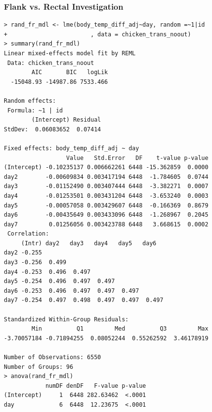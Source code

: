 \documentclass[a4paper, 10pt, titlepage]{article}
\begin{document}
\subsubsection{Flank vs. Rectal Investigation}
\begin{lstlisting}[basicstyle = \footnotesize \ttfamily]
> rand_fr_mdl <- lme(body_temp_diff_adj~day, random =~1|id
+                        , data = chicken_trans_noout)
> summary(rand_fr_mdl)
Linear mixed-effects model fit by REML
 Data: chicken_trans_noout 
        AIC       BIC   logLik
  -15048.93 -14987.86 7533.466

Random effects:
 Formula: ~1 | id
        (Intercept) Residual
StdDev:  0.06083652  0.07414

Fixed effects: body_temp_diff_adj ~ day 
                  Value   Std.Error   DF    t-value p-value
(Intercept) -0.10235137 0.006662261 6448 -15.362859  0.0000
day2        -0.00609834 0.003417194 6448  -1.784605  0.0744
day3        -0.01152490 0.003407444 6448  -3.382271  0.0007
day4        -0.01253501 0.003431204 6448  -3.653240  0.0003
day5        -0.00057058 0.003429607 6448  -0.166369  0.8679
day6        -0.00435649 0.003433096 6448  -1.268967  0.2045
day7         0.01256056 0.003423788 6448   3.668615  0.0002
 Correlation: 
     (Intr) day2   day3   day4   day5   day6  
day2 -0.255                                   
day3 -0.256  0.499                            
day4 -0.253  0.496  0.497                     
day5 -0.254  0.496  0.497  0.497              
day6 -0.253  0.496  0.497  0.497  0.497       
day7 -0.254  0.497  0.498  0.497  0.497  0.497

Standardized Within-Group Residuals:
        Min          Q1         Med          Q3         Max 
-3.70057184 -0.71894255  0.08052244  0.55262592  3.46178919 

Number of Observations: 6550
Number of Groups: 96 
> anova(rand_fr_mdl)
            numDF denDF   F-value p-value
(Intercept)     1  6448 282.63462  <.0001
day             6  6448  12.23675  <.0001

\end{lstlisting}
\end{document}
